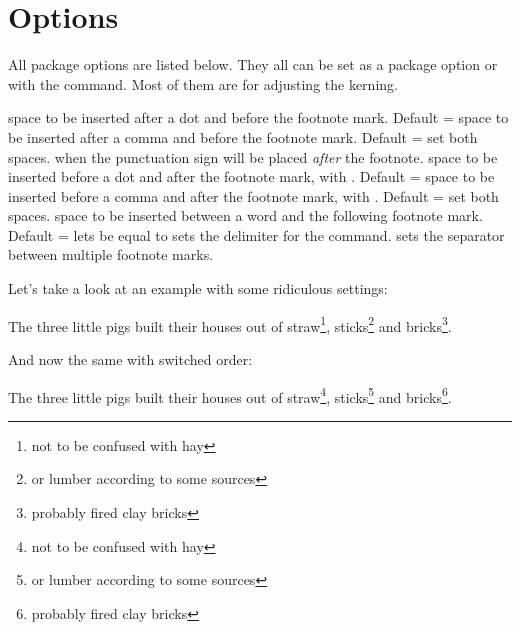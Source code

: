 \documentclass[toc=index,toc=bib]{cnpkgdoc}
\begin{document}
\section{Options}
All package options are listed below. They all can be set as a package option or
with the  command. Most of them are for adjusting the kerning.
\begin{beschreibung}
  space to be inserted after a dot and before the
 footnote mark. Default = \code{-.06em}
  space to be inserted after a comma and before
 the footnote mark. Default = \code{-.06em}
  set both spaces.
  when  the punctuation sign
 will be placed \emph{after} the footnote.
  space to be inserted before a dot and after the
 footnote mark, \ie with . Default = \code{-.15em}
  space to be inserted before a comma and after
 the footnote mark, \ie with . Default = \code{-.15em}
  set both spaces.
  space to be inserted between a word and the
 following footnote mark. Default = \code{.06em}
  lets  be equal to
  sets the delimiter for the 
 command.
  sets the separator between multiple footnote
 marks.
\end{beschreibung}

Let's take a look at an example with some ridiculous settings:
\begin{beispiel}
 \begin{minipage}{.4\linewidth}
  \noindent The three little pigs built their houses
  out of straw\footnote{not to be confused with hay},
  sticks\footnote{or lumber according to some sources}
  and bricks\footnote{probably fired clay bricks}.
 \end{minipage}
\end{beispiel}

And now the same with switched order:
\begin{beispiel}
 \begin{minipage}{.4\linewidth}
  \noindent The three little pigs built their houses
  out of straw\footnote{not to be confused with hay},
  sticks\footnote{or lumber according to some sources}
  and bricks\footnote{probably fired clay bricks}.
 \end{minipage}
\end{beispiel}
\end{document}
